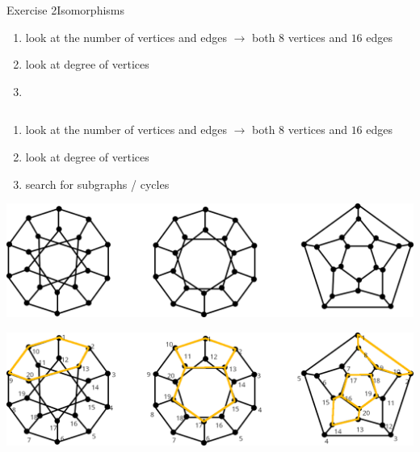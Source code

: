 \begin{frame}[allowframebreaks]{Exercise 2}{Isomorphisms}
\begin{solutionnoinc}
    \begin{enumerate}
      \item look at the \alert{number} of \alert{vertices} and \alert{edges} $\rightarrow$ both $8$ vertices and $16$ edges
      \item look at \alert{degree} of vertices
      \item[]
    \end{enumerate}
  \end{solutionnoinc}
  \begin{solution}
    \begin{columns}
      \begin{column}{0.5\textwidth}
      \end{column}
      \begin{column}{0.5\textwidth}
      \end{column}
    \end{columns}
    \vspace{0.5cm}
    \begin{enumerate}
      \item look at the \alert{number} of \alert{vertices} and \alert{edges} $\rightarrow$ both $8$ vertices and $16$ edges
      \item look at \alert{degree} of vertices
      \item search for \alert{subgraphs} / \alert{cycles}
    \end{enumerate}
  \end{solution}
  \begin{requirementsnoinc}
    \includegraphics[width=\textwidth]{./figures/isomorphism2.png}
  \end{requirementsnoinc}
  \begin{solutionnoinc}
    \includegraphics[width=\textwidth]{./figures/isomorphism2_sol.png}

\end{solutionnoinc}
\end{frame}
